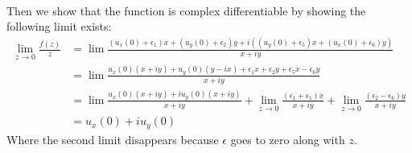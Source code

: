 \documentclass{homework}
\begin{document}
\begin{solution}
\begin{align*}
                                                                                                                               \end{align*}
                                                                                                                               Then we show that the function is complex differentiable by showing the following limit exists:
                                                                                                                               \begin{align*}
                                                                                                                               \lim_{z\to 0} \frac{f(z)}{z} &= \lim \frac{(u_x(0)+\epsilon_1)x + (u_y(0)+\epsilon_2)y + i((u_y(0)+\epsilon_5)x + (u_x(0)+\epsilon_6)y)}{x+ iy}\\
                                                                                                                               &= \lim \frac{u_x(0)(x+iy) + u_y(0)(y-ix) + \epsilon_1x + \epsilon_2y + \epsilon_5x - \epsilon_6y}{x+ iy}\\
                                                                                                                               &= \lim \frac{u_x(0)(x+iy) + iu_y(0)(x+iy)}{x+iy} + \lim_{z\to 0} \frac{(\epsilon_1+\epsilon_5)x}{x+iy} + \lim_{z\to 0}\frac{(\epsilon_2 - \epsilon_6)y}{x+ iy}\\
                                                                                                                               &= u_x(0) + iu_y(0)
                                                                                                                               \end{align*}
                                                                                                                               Where the second limit disappears because $\epsilon$ goes to zero along with $z$.
                                                                                                                               \end{solution}
\end{document}

